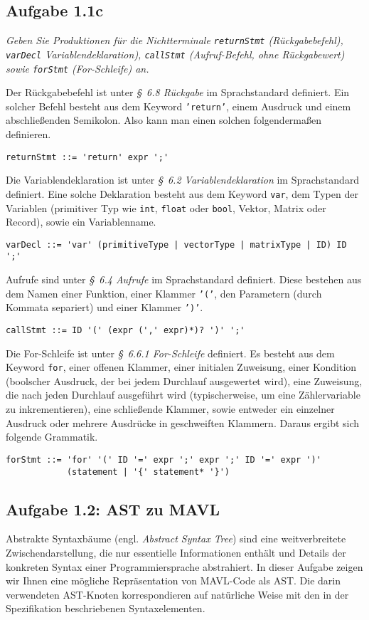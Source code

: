 \documentclass[
  ngerman,
  DIV=14
]{scrartcl}
\begin{document}
\subsection*{Aufgabe 1.1c}

\emph{Geben Sie Produktionen für die Nichtterminale \texttt{returnStmt} (Rückgabebefehl), \texttt{varDecl} Variablendeklaration), \texttt{callStmt} (Aufruf-Befehl, ohne Rückgabewert) sowie \texttt{forStmt} (For-Schleife) an.}

\bigskip\noindent
Der Rückgabebefehl ist unter \emph{§~6.8 Rückgabe} im Sprachstandard definiert. Ein solcher Befehl besteht aus dem Keyword \texttt{'return'}, einem Ausdruck und einem abschließenden Semikolon. Also kann man einen solchen folgendermaßen definieren.
\begin{lstlisting}
returnStmt ::= 'return' expr ';'
\end{lstlisting}
Die Variablendeklaration ist unter \emph{§~6.2 Variablendeklaration} im Sprachstandard definiert. Eine solche Deklaration besteht aus dem Keyword \texttt{var}, dem Typen der Variablen (primitiver Typ wie \texttt{int}, \texttt{float} oder \texttt{bool}, Vektor, Matrix oder Record), sowie ein Variablenname.
\begin{lstlisting}
varDecl ::= 'var' (primitiveType | vectorType | matrixType | ID) ID ';'  
\end{lstlisting}
Aufrufe sind unter \emph{§~6.4 Aufrufe} im Sprachstandard definiert. Diese bestehen aus dem Namen einer Funktion, einer Klammer \texttt{'('}, den Parametern (durch Kommata separiert) und einer Klammer \texttt{')'}.
\begin{lstlisting}
callStmt ::= ID '(' (expr (',' expr)*)? ')' ';'
\end{lstlisting}
Die For-Schleife ist unter \emph{§~6.6.1 For-Schleife} definiert. Es besteht aus dem Keyword \texttt{for}, einer offenen Klammer, einer initialen Zuweisung, einer Kondition (boolscher Ausdruck, der bei jedem Durchlauf ausgewertet wird), eine Zuweisung, die nach jeden Durchlauf ausgeführt wird (typischerweise, um eine Zählervariable zu inkrementieren), eine schließende Klammer, sowie entweder ein einzelner Ausdruck oder mehrere Ausdrücke in geschweiften Klammern. Daraus ergibt sich folgende Grammatik.
\begin{lstlisting}
forStmt ::= 'for' '(' ID '=' expr ';' expr ';' ID '=' expr ')'
            (statement | '{' statement* '}')
\end{lstlisting}



\subsection*{Aufgabe 1.2: AST zu MAVL}
Abstrakte Syntaxbäume (engl. \emph{Abstract Syntax Tree}) sind eine weitverbreitete Zwischendarstellung, die nur essentielle Informationen enthält und Details der konkreten Syntax einer Programmiersprache abstrahiert. In dieser Aufgabe zeigen wir Ihnen eine mögliche Repräsentation von MAVL-Code als AST. Die darin verwendeten AST-Knoten korrespondieren auf natürliche Weise mit den in der Spezifikation beschriebenen Syntaxelementen. 
\end{document}
